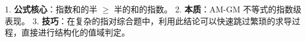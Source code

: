 \begin{summarybox}
1. \textbf{公式核心}：指数和的半 $\geqslant$ 半的和的指数。
2. \textbf{本质}：AM-GM 不等式的指数级表现。
3. \textbf{技巧}：在复杂的指对综合题中，利用此结论可以快速跳过繁琐的求导过程，直接进行结构化的值域判定。
\end{summarybox}
